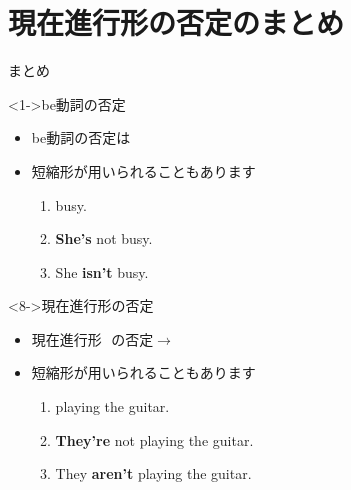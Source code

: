 \documentclass[aspectratio=169,xcolor={dvipsnames,table}]{beamer}
\begin{document}
\section{現在進行形の否定のまとめ}
\begin{frame}[plain,t]{まとめ}
 
\begin{block}<1->{be動詞の否定}\small
\begin{itemize}[square]
 \item<1->  be動詞の否定は\,\,
 \item<2-> 短縮形が用いられることもあります
       \begin{enumerate}[circle]
	\item<3->  busy.
	\item<5-> \textbf{She's} not busy.
	\item<7-> She \textbf{isn't} busy.
       \end{enumerate}
\end{itemize}
\end{block}

\begin{block}<8->{現在進行形の否定}\small
\begin{itemize}[square]
 \item<8->  現在進行形\,\,\,\,の否定$\longrightarrow$\,\,%
 \item<9-> 短縮形が用いられることもあります
       \begin{enumerate}[circle]
	\item<10->  playing the guitar.
	\item<12-> \textbf{They're} not playing the guitar.
	\item<14-> They \textbf{aren't} playing the guitar.
       \end{enumerate}
\end{itemize}
\end{block}


\end{frame}
\end{document}
